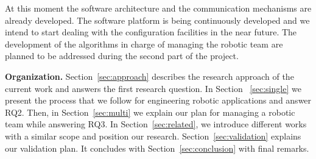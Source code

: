 At this moment the software architecture and the communication mechanisms are already developed.
The software platform is being continuously developed and we intend to start dealing with the configuration facilities in the near future.
The development of the algorithms in charge of managing the robotic team are planned to be addressed during the second part of the project.

\textbf{Organization.} 
Section~\ref{sec:approach} describes the research approach of the current work and answers the first research question.
In Section ~\ref{sec:single} we present the process that we follow for engineering robotic applications and answer RQ2.
Then, in Section~\ref{sec:multi} we explain our plan for managing a robotic team while answering RQ3.
In Section~\ref{sec:related}, we introduce different works with a similar scope and position our research.
Section~\ref{sec:validation} explains our validation plan.
It concludes with Section~\ref{sec:conclusion} with final remarks.